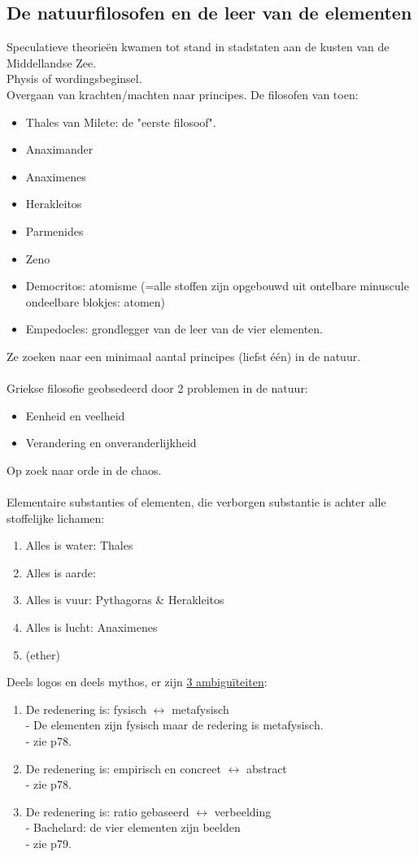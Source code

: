 \subsection{De natuurfilosofen en de leer van de elementen}
Speculatieve theorie\"en kwamen tot stand in stadstaten aan de kusten van de Middellandse Zee.
\\
Physis of wordingsbeginsel.
\\Overgaan van krachten/machten naar principes.
De filosofen van toen:
\begin{itemize}
\item Thales van Milete: de "eerste filosoof".
\item Anaximander
\item Anaximenes
\item Herakleitos
\item Parmenides
\item Zeno
\item Democritos: atomisme (=alle stoffen zijn opgebouwd uit ontelbare minuscule ondeelbare blokjes: atomen)
\item Empedocles: grondlegger van de leer van de vier elementen.
\end{itemize}
Ze zoeken naar een minimaal aantal principes (liefst \'e\'en) in de natuur.
\\
\\
Griekse filosofie geobsedeerd door 2 problemen in de natuur:
\begin{itemize}
\item Eenheid en veelheid
\item Verandering en onveranderlijkheid
\end{itemize}
Op zoek naar orde in de chaos.
\\
\\
Elementaire substanties of elementen, die verborgen substantie is achter alle stoffelijke lichamen:
\begin{enumerate}
\item Alles is water: Thales
\item Alles is aarde:
\item Alles is vuur: Pythagoras \& Herakleitos
\item Alles is lucht: Anaximenes
\item (ether)
\end{enumerate}
Deels logos en deels mythos, er zijn \underline{3 ambigu\"iteiten}:
\begin{enumerate}
\item De redenering is: fysisch $\leftrightarrow$ metafysisch
\\-  De elementen zijn fysisch maar de redering is metafysisch.
\\- zie p78.
\item De redenering is: empirisch en concreet $\leftrightarrow$ abstract
\\- zie p78.
\item De redenering is: ratio gebaseerd $\leftrightarrow$ verbeelding
\\- Bachelard: de vier elementen zijn beelden
\\- zie p79.
\end{enumerate}
